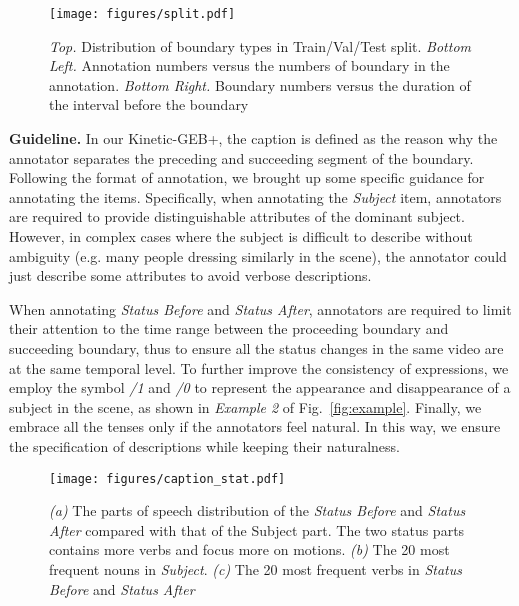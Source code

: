 \documentclass[runningheads]{llncs}
\begin{document}
\begin{figure}[t]
\centering
\texttt{[image: figures/split.pdf]}
\setlength{\abovecaptionskip}{0.9cm}
\caption{\textit{Top.} Distribution of boundary types in Train/Val/Test split. \textit{Bottom Left.} Annotation numbers versus the numbers of boundary in the annotation. \textit{Bottom Right.} Boundary numbers versus the duration of the interval before the boundary}
\label{fig:split}
\end{figure}

\textbf{Guideline.}
In our Kinetic-GEB+, the caption is defined as the reason why the annotator separates the preceding and succeeding segment of the boundary. Following the format of annotation, we brought up some specific guidance for annotating the items. Specifically, when annotating the \textit{Subject} item, annotators are required to provide distinguishable attributes of the dominant subject. However, in complex cases where the subject is difficult to describe without ambiguity  (e.g. many people dressing similarly in the scene), the annotator could just describe some attributes to avoid verbose descriptions.

When annotating \textit{Status Before} and \textit{Status After}, annotators are required to limit their attention to the time range between the proceeding boundary and succeeding boundary, thus to ensure all the status changes in the same video are at the same temporal level. To further improve the consistency of expressions, we employ the symbol \textit{/1} and \textit{/0} to represent the appearance and disappearance of a subject in the scene, as shown in \textit{Example 2} of Fig.~\ref{fig:example}. Finally, we embrace all the tenses only if the annotators feel natural. In this way, we ensure the specification of descriptions while keeping their naturalness.


\begin{figure}[t]
\centering
\texttt{[image: figures/caption\_stat.pdf]}
\setlength{\abovecaptionskip}{0.5cm}
\caption{\textit{(a)} The parts of speech distribution of the \textit{Status Before} and \textit{Status After} compared with that of the Subject part. The two status parts contains more verbs and focus more on motions. \textit{(b)} The 20 most frequent nouns in \textit{Subject}. \textit{(c)} The 20 most frequent verbs in \textit{Status Before} and \textit{Status After}}
\label{fig:caption_stat}
\end{figure}
\end{document}
